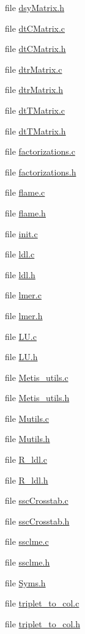 \begin{CompactItemize}
file \hyperlink{dsyMatrix_8h}{dsy\-Matrix.h}
\item 
file \hyperlink{dtCMatrix_8c}{dt\-CMatrix.c}
\item 
file \hyperlink{dtCMatrix_8h}{dt\-CMatrix.h}
\item 
file \hyperlink{dtrMatrix_8c}{dtr\-Matrix.c}
\item 
file \hyperlink{dtrMatrix_8h}{dtr\-Matrix.h}
\item 
file \hyperlink{dtTMatrix_8c}{dt\-TMatrix.c}
\item 
file \hyperlink{dtTMatrix_8h}{dt\-TMatrix.h}
\item 
file \hyperlink{factorizations_8c}{factorizations.c}
\item 
file \hyperlink{factorizations_8h}{factorizations.h}
\item 
file \hyperlink{flame_8c}{flame.c}
\item 
file \hyperlink{flame_8h}{flame.h}
\item 
file \hyperlink{init_8c}{init.c}
\item 
file \hyperlink{ldl_8c}{ldl.c}
\item 
file \hyperlink{ldl_8h}{ldl.h}
\item 
file \hyperlink{lmer_8c}{lmer.c}
\item 
file \hyperlink{lmer_8h}{lmer.h}
\item 
file \hyperlink{LU_8c}{LU.c}
\item 
file \hyperlink{LU_8h}{LU.h}
\item 
file \hyperlink{Metis__utils_8c}{Metis\_\-utils.c}
\item 
file \hyperlink{Metis__utils_8h}{Metis\_\-utils.h}
\item 
file \hyperlink{Mutils_8c}{Mutils.c}
\item 
file \hyperlink{Mutils_8h}{Mutils.h}
\item 
file \hyperlink{R__ldl_8c}{R\_\-ldl.c}
\item 
file \hyperlink{R__ldl_8h}{R\_\-ldl.h}
\item 
file \hyperlink{sscCrosstab_8c}{ssc\-Crosstab.c}
\item 
file \hyperlink{sscCrosstab_8h}{ssc\-Crosstab.h}
\item 
file \hyperlink{ssclme_8c}{ssclme.c}
\item 
file \hyperlink{ssclme_8h}{ssclme.h}
\item 
file \hyperlink{Syms_8h}{Syms.h}
\item 
file \hyperlink{triplet__to__col_8c}{triplet\_\-to\_\-col.c}
\item 
file \hyperlink{triplet__to__col_8h}{triplet\_\-to\_\-col.h}
\end{CompactItemize}
